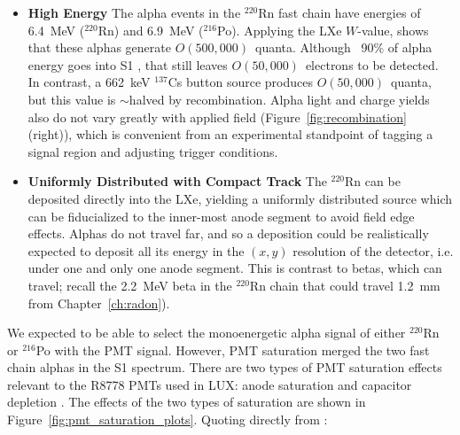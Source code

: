 \begin{itemize}
\item \textbf{High Energy} The alpha events in the $^{220}$Rn fast chain have energies of 6.4~MeV ($^{220}$Rn)  and 6.9~MeV ($^{216}$Po). Applying the \ac{LXe} $W$-value, shows that these alphas generate $O(500,000)$~quanta. Although ~90\% of alpha energy goes into S1 \cite{Aprile2010}, that still leaves $O(50,000)$~electrons to be detected. In contrast, a 662~keV $^{137}$Cs button source produces $O(50,000)$~quanta, but this value is $\sim$halved by recombination. Alpha light and charge yields also do not vary greatly with applied field (Figure~\ref{fig:recombination} (right)), which is convenient from an experimental standpoint of tagging a signal region and adjusting trigger conditions.  
\item \textbf{Uniformly Distributed with Compact Track} The $^{220}$Rn can be deposited directly into the \ac{LXe}, yielding a uniformly distributed source which can be fiducialized to the inner-most anode segment to avoid field edge effects. Alphas do not travel far, and so a deposition could be realistically expected to deposit all its energy in the $(x,y)$ resolution of the detector, i.e. under one and only one anode segment. This is contrast to betas, which can travel; recall the 2.2~MeV beta in the $^{220}$Rn chain that could travel 1.2~mm from Chapter~\ref{ch:radon}).
\end{itemize}

We expected to be able to select the monoenergetic alpha signal of either $^{220}$Rn or $^{216}$Po with the \ac{PMT} signal. However, \ac{PMT} saturation merged the two fast chain alphas in the S1 spectrum. There are two types of \ac{PMT} saturation effects relevant to the R8778 \ac{PMT}s used in \ac{LUX}: anode saturation and capacitor depletion \cite{Faham2014a}. The effects of the two types of saturation are shown in Figure~\ref{fig:pmt_saturation_plots}. Quoting directly from \cite{Faham2014a}:

